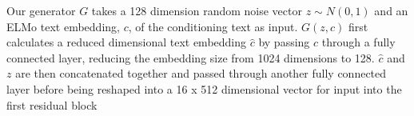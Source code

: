 Our generator $G$ takes a 128 dimension random noise vector $z \sim N(0, 1)$ and an ELMo text embedding, $c$, of the conditioning text as input. $G(z, c)$ first calculates a reduced dimensional text embedding $\hat{c}$ by passing $c$ through a fully connected layer, reducing the embedding size from 1024 dimensions to 128. $\hat{c}$ and $z$ are then concatenated together and passed through another fully connected layer before being reshaped into a 16 x 512 dimensional vector for input into the first residual block 